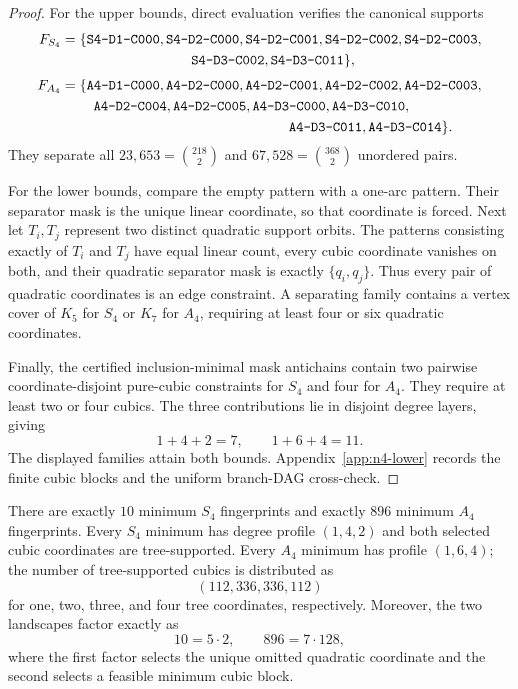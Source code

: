 \begin{proof}
For the upper bounds, direct evaluation verifies the canonical supports
\begin{align*}
F_{S_4}={}&\{\coord{S4-D1-C000},\coord{S4-D2-C000},
\coord{S4-D2-C001},\coord{S4-D2-C002},\coord{S4-D2-C003},\\
&\hspace{8em}\coord{S4-D3-C002},\coord{S4-D3-C011}\},\\[0.3em]
F_{A_4}={}&\{\coord{A4-D1-C000},\coord{A4-D2-C000},
\coord{A4-D2-C001},\coord{A4-D2-C002},\coord{A4-D2-C003},\\
&\quad\coord{A4-D2-C004},\coord{A4-D2-C005},
\coord{A4-D3-C000},\coord{A4-D3-C010},\\
&\hspace{15em}\coord{A4-D3-C011},\coord{A4-D3-C014}\}.
\end{align*}
They separate all $23{,}653=\binom{218}{2}$ and
$67{,}528=\binom{368}{2}$ unordered pairs.

For the lower bounds, compare the empty pattern with a one-arc pattern.  Their
separator mask is the unique linear coordinate, so that coordinate is forced.
Next let $T_i,T_j$ represent two distinct quadratic support orbits.  The
patterns consisting exactly of $T_i$ and $T_j$ have equal linear count, every
cubic coordinate vanishes on both, and their quadratic separator mask is
exactly $\{q_i,q_j\}$.  Thus every pair of quadratic coordinates is an edge
constraint.  A separating family contains a vertex cover of $K_5$ for $S_4$
or $K_7$ for $A_4$, requiring at least four or six quadratic coordinates.

Finally, the certified inclusion-minimal mask antichains contain two
pairwise coordinate-disjoint pure-cubic constraints for $S_4$ and four for
$A_4$.  They require at least two or four cubics.  The three contributions
lie in disjoint degree layers, giving
\[
  1+4+2=7,\qquad 1+6+4=11.
\]
The displayed families attain both bounds.  Appendix~\ref{app:n4-lower}
records the finite cubic blocks and the uniform branch-DAG cross-check.
\end{proof}



\begin{proposition}
\label{prop:n4-landscapes}
There are exactly $10$ minimum $S_4$ fingerprints and exactly $896$ minimum
$A_4$ fingerprints.  Every $S_4$ minimum has degree profile $(1,4,2)$ and
both selected cubic coordinates are tree-supported.  Every $A_4$ minimum has
profile $(1,6,4)$; the number of tree-supported cubics is distributed as
\[
  (112,336,336,112)
\]
for one, two, three, and four tree coordinates, respectively.  Moreover, the
two landscapes factor exactly as
\[
  10=5\cdot2,\qquad 896=7\cdot128,
\]
where the first factor selects the unique omitted quadratic coordinate and
the second selects a feasible minimum cubic block.
\end{proposition}

